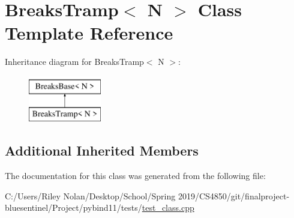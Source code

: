 \hypertarget{class_breaks_tramp}{}\section{Breaks\+Tramp$<$ N $>$ Class Template Reference}
\label{class_breaks_tramp}
Inheritance diagram for Breaks\+Tramp$<$ N $>$\+:\begin{figure}[H]
\begin{center}
\leavevmode
\includegraphics[height=2.000000cm]{class_breaks_tramp}
\end{center}
\end{figure}
\subsection*{Additional Inherited Members}


The documentation for this class was generated from the following file\+:\begin{DoxyCompactItemize}
\item 
C\+:/\+Users/\+Riley Nolan/\+Desktop/\+School/\+Spring 2019/\+C\+S4850/git/finalproject-\/bluesentinel/\+Project/pybind11/tests/\mbox{\hyperlink{test__class_8cpp}{test\+\_\+class.\+cpp}}\end{DoxyCompactItemize}
